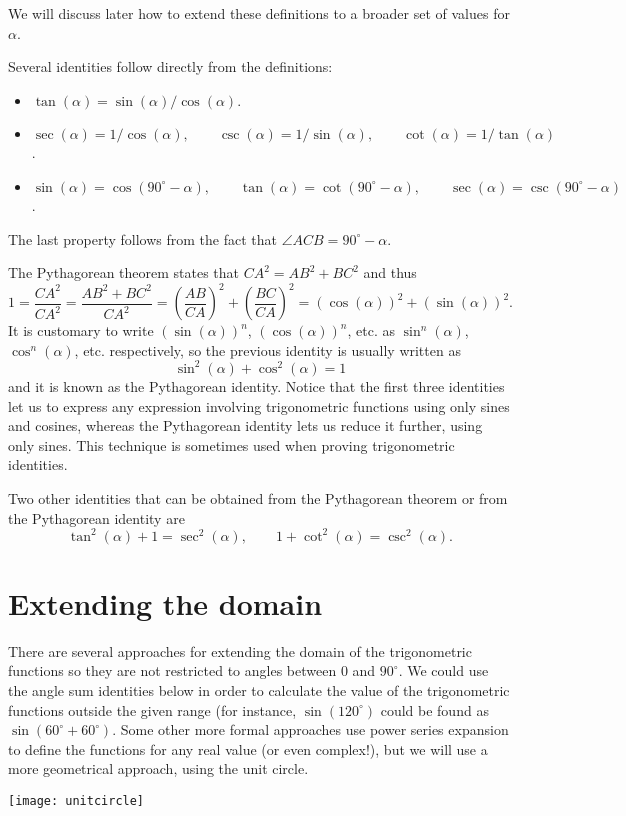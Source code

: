 \documentclass[12pt]{article}
\begin{document}
We will discuss later how to extend these definitions to a broader set of values for $\alpha$.

Several identities follow directly from the definitions:
\begin{itemize}
\item $\tan(\alpha)=\sin(\alpha)/\cos(\alpha)$.
\item $\sec(\alpha)=1/\cos(\alpha),\qquad \csc(\alpha)=1/\sin(\alpha),\qquad\cot(\alpha)=1/\tan(\alpha)$.
\item $\sin(\alpha) = \cos(90^\circ-\alpha),\qquad\tan(\alpha)=\cot(90^\circ -\alpha),\qquad\sec(\alpha)=\csc(90^\circ-\alpha)$.
\end{itemize}
The last property follows from the fact that $\angle ACB=90^\circ-\alpha$.

The Pythagorean theorem states that $CA^2 = AB^2+BC^2$ and thus
$$
1=\frac{CA^2}{CA^2}=\frac{AB^2+ BC^2}{CA^2}
= \left(\frac{AB}{CA}\right)^2+\left(\frac{BC}{CA}\right)^2 = (\cos(\alpha))^2 + (\sin(\alpha))^2.
$$
It is customary to write $(\sin(\alpha))^n$, $(\cos(\alpha))^n$, etc. as $\sin^n(\alpha)$, $\cos^n(\alpha)$, etc. respectively, so the previous identity is usually written as
$$
\sin^2(\alpha) + \cos^2(\alpha) = 1
$$
and it is known as the Pythagorean identity.
Notice that the first three identities let us to express any expression involving trigonometric functions using only sines and cosines, whereas the Pythagorean identity lets us reduce it further, using only sines. This technique is sometimes used when proving trigonometric identities.

Two other identities that can be obtained from the Pythagorean theorem or from the Pythagorean identity are
$$
\tan^2(\alpha) + 1 = \sec^2(\alpha),\qquad 1 + \cot^2(\alpha) = \csc^2(\alpha).
$$

\section{Extending the domain}
There are several approaches for extending the domain of the trigonometric functions so they are not restricted to angles between $0$ and $90^\circ$. We could use the angle sum identities below in order to calculate the value of the trigonometric functions outside the given range (for instance, $\sin(120^\circ)$ could be found as $\sin(60^\circ + 60^\circ)$. Some other more formal approaches use power series expansion to define the functions for any real value (or even complex!), but we will use a more geometrical approach, using the unit circle.
\begin{center}
\texttt{[image: unitcircle]}
\end{center}
\end{document}
